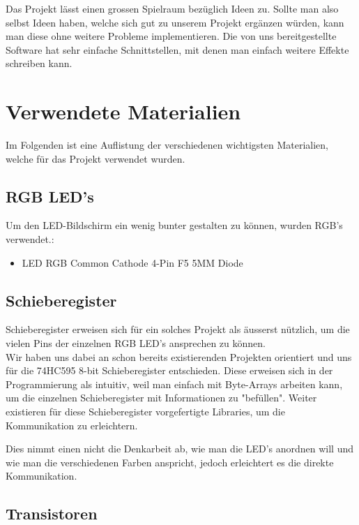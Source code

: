 \documentclass[12pt,a4paper]{article}
\begin{document}
Das Projekt lässt einen grossen Spielraum bezüglich Ideen zu. Sollte man also selbst Ideen haben, welche sich gut zu unserem Projekt ergänzen würden, kann man diese ohne weitere Probleme implementieren. Die von uns bereitgestellte Software hat sehr einfache Schnittstellen, mit denen man einfach weitere Effekte schreiben kann\cite{readMeCode}.


\section{Verwendete Materialien}

Im Folgenden ist eine Auflistung der verschiedenen wichtigsten Materialien, welche für das Projekt verwendet wurden.

\subsection{RGB LED's}

Um den LED-Bildschirm ein wenig bunter gestalten zu können, wurden RGB's verwendet.:

\begin{itemize}
    \item LED RGB Common Cathode 4-Pin F5 5MM Diode
\end{itemize}

\subsection{Schieberegister}

Schieberegister erweisen sich für ein solches Projekt als äusserst nützlich, um die vielen Pins der einzelnen RGB LED's ansprechen zu können. \\

Wir haben uns dabei an schon bereits existierenden Projekten orientiert \cite{RGB LED Cube} und uns für die 74HC595 8-bit Schieberegister entschieden. Diese erweisen sich in der Programmierung als intuitiv, weil man einfach mit Byte-Arrays arbeiten kann, um die einzelnen Schieberegister mit Informationen zu "befüllen". Weiter existieren für diese Schieberegister vorgefertigte Libraries, um die Kommunikation zu erleichtern\cite{SPI}.

Dies nimmt einen nicht die Denkarbeit ab, wie man die LED's anordnen will und wie man die verschiedenen Farben anspricht, jedoch erleichtert es die direkte Kommunikation.

\subsection{Transistoren}
\end{document}
